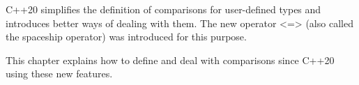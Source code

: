 C++20 simplifies the definition of comparisons for user-defined types and introduces better ways of dealing with them. The new operator <=> (also called the spaceship operator) was introduced for this purpose.

This chapter explains how to define and deal with comparisons since C++20 using these new features.